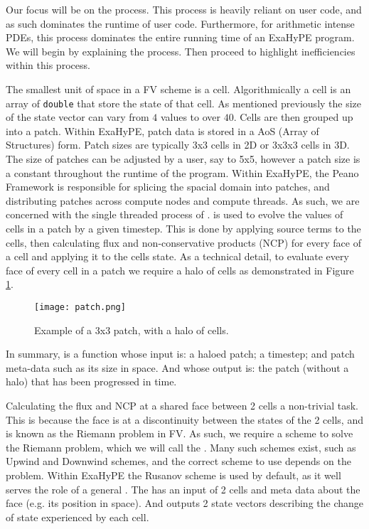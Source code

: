 Our focus will be on the  process.
This process is heavily reliant on user code, and as such dominates the runtime of user code.
Furthermore, for arithmetic intense PDEs, this process dominates the entire running time of an ExaHyPE program.
We will begin by explaining the  process.
Then proceed to highlight inefficiencies within this process. 

The smallest unit of space in a FV scheme is a cell.
Algorithmically a cell is an array of \lstinline{double} that store the state of that cell.
As mentioned previously the size of the state vector can vary from $4$ values to over $40$.
Cells are then grouped up into a patch.
Within ExaHyPE, patch data is stored in a AoS (Array of Structures) form.
Patch sizes are typically 3x3 cells in 2D or 3x3x3 cells in 3D.
The size of patches can be adjusted by a user, say to 5x5, however a patch size is a constant throughout the runtime of the program.
Within ExaHyPE, the Peano Framework \cite{PeanoFramework} is responsible for splicing the spacial domain into patches, and distributing patches across compute nodes and compute threads.
As such, we are concerned with the single threaded process of .
 is used to evolve the values of cells in a patch by a given timestep.
This is done by applying source terms to the cells, then calculating flux and non-conservative products (NCP) for every face of a cell and applying it to the cells state.
As a technical detail, to evaluate every face of every cell in a patch we require a halo of cells as demonstrated in Figure \ref{fig:patch}.

\begin{figure}[h!]
    \begin{center}
        \texttt{[image: patch.png]}
        \caption{Example of a 3x3 patch, with a halo of cells.}
        \label{fig:patch}
    \end{center}
\end{figure}


In summary,  is a function whose input is: a haloed patch; a timestep; and patch meta-data such as its size in space. And whose output is: the patch (without a halo) that has been progressed in time. 

Calculating the flux and NCP at a shared face between 2 cells a non-trivial task.
This is because the face is at a discontinuity between the states of the 2 cells, and is known as the Riemann problem in FV.
As such, we require a scheme to solve the Riemann problem, which we will call the .
Many such schemes exist, such as Upwind and Downwind schemes, and the correct scheme to use depends on the problem.
Within ExaHyPE the Rusanov scheme \cite{rusanov} is used by default, as it well serves the role of a general .
The  has an input of 2 cells and meta data about the face (e.g. its position in space).
And outputs 2 state vectors describing the change of state experienced by each cell.

